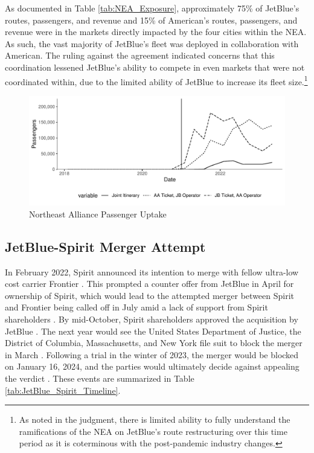 \documentclass{article}
\begin{document}
	 As documented in Table \ref{tab:NEA_Exposure}, approximately 75\% of JetBlue's routes, passengers, and revenue and 15\% of American's routes, passengers, and revenue were in the markets directly impacted by the four cities within the NEA. As such, the vast majority of JetBlue's fleet was deployed in collaboration with American. The ruling against the agreement indicated concerns that this coordination lessened JetBlue's ability to compete in even markets that were not coordinated within, due to the limited ability of JetBlue to increase its fleet size.\footnote{As noted in the judgment, there is limited ability to fully understand the ramifications of the NEA on JetBlue's route restructuring over this time period as it is coterminous with the post-pandemic industry changes.}

    \begin{figure}
        \caption{Northeast Alliance Passenger Uptake}
        \label{fig:NEA_Uptake}
        \includegraphics[width = \linewidth]{05.Figures/NEA_OperationsGraph}
    \end{figure}
    
	\subsection{JetBlue-Spirit Merger Attempt}
	\label{sec:Setting_Merger}
	In February 2022, Spirit announced its intention to merge with fellow ultra-low cost carrier Frontier \citep{schaper_frontier-spirit_2022}. This prompted a counter offer from JetBlue in April for ownership of Spirit, which would lead to the attempted merger between Spirit and Frontier being called off in July amid a lack of support from Spirit shareholders \citep{josephs_jetblue_2022, josephs_spirit_2022}. By mid-October, Spirit shareholders approved the acquisition by JetBlue \citep{koenig_spirit_2022}. The next year would see the United States Department of Justice, the District of Columbia, Massachusetts, and New York file suit to block the merger in March \citep{chokshi_justice_2023}. Following a trial in the winter of 2023, the merger would be blocked on January 16, 2024, and the parties would ultimately decide against appealing the verdict \citep{chapman_jetblue_2024}.  These events are summarized in Table \ref{tab:JetBlue_Spirit_Timeline}. 
\end{document}
